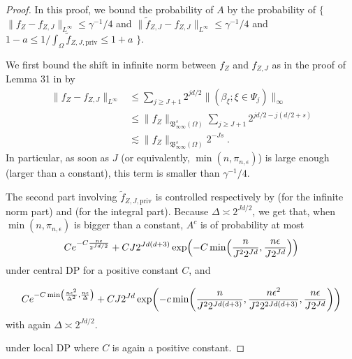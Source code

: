 \documentclass{article}
\newcommand{\DC}{\Dmargincomment}
\newcommand{\1}{\mathds{1}}
\DeclarePairedDelimiter{\paren}{\lparen}{\rparen}
\theoremstyle{plain}
\theoremstyle{definition}
\theoremstyle{remark}
\begin{document}
\begin{proof}
In this proof, we bound the probability of $A$ by the probability of %
$\bigl\{$ $\| {f}_{Z } - {f}_{Z, J} \|_{L^{\infty}} \leq \gamma^{-1}/4$ and {$\| {\tilde{f}}_{Z, J} - {f}_{Z, J} \|_{L^{\infty}}\leq \gamma^{-1}/4 $} and $1 - a \leq  1 /\int_{\Omega} \tilde{f}_{Z, J, \textrm{priv} } \leq 1 + a$ $\bigr\} $. 

    We first bound the shift in infinite norm between ${f}_{Z }$ and ${f}_{Z, J}$ as in the proof of Lemma 31 in \cite{Manole2024Plugin} by
\begin{equation}
    \begin{aligned}
        \| {f}_{Z } - {f}_{Z, J} \|_{L^{\infty}}
        &\leq \sum_{j \geq J+1} 2^{j d /2} \| ({\beta}_{\xi};  \xi \in \Psi_j) \|_{\infty} \\
        &\leq \| f_Z \|_{\mathfrak{B}_{\infty \infty}^s (\Omega)} \sum_{j \geq J+1} 2^{j d /2 - j(d/2 + s)} \\
        &\lesssim \| f_Z \|_{\mathfrak{B}_{\infty \infty}^s (\Omega)} 2^{-Js} \;.
    \end{aligned}
\end{equation}
In particular, as soon as $J$ (or equivalently, $\min(n, \pi_{n,\epsilon})$) is large enough (larger than a constant), this term is smaller than $\gamma^{-1}/4$.

The second part involving $\tilde{f}_{Z, J, \textrm{priv}}$  is controlled respectively  by   (for the infinite norm part) and   (for the integral part).
Because $\Delta \asymp 2^{Jd/2}$, we get that, when $\min(n, \pi_{n,\epsilon})$ is bigger than a constant, $A^{c}$ is of probability at most 
\begin{equation}
     C e^{- C \frac{n \epsilon}{2^{Jd/2}}} + C J 2^{Jd(d+3)} \exp \paren*{-C \min \paren*{\frac{n}{J^2 2^{Jd}}, \frac{n\epsilon}{J 2^{Jd}} }}
\end{equation}
under central DP for a positive constant $C$, and

\begin{equation}
     C e^{- C \min \paren*{ \frac{n \epsilon^2 }{\Delta^2}, \frac{n \epsilon }{\Delta}} }  + C J 2^{Jd} \exp \paren*{-c \min \paren*{\frac{n}{J^2 2^{Jd(d+3)}}, \frac{n\epsilon^2}{J^2 2^{2Jd (d+3)}}, \frac{n\epsilon}{J2^{Jd}}}} 
\end{equation}
with again $\Delta \asymp 2^{Jd/2}$.

under local DP where $C$ is again a positive constant.


\end{proof}
\end{document}
